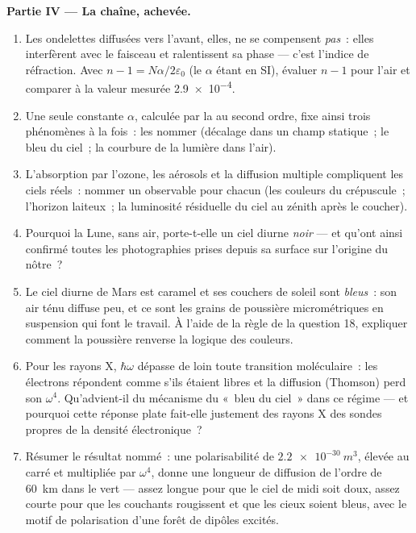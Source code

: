\begin{problem}
\medskip\noindent\textbf{Partie IV --- La chaîne, achevée.}
\begin{enumerate}[resume]
  \item Les ondelettes diffusées vers l'avant, elles, ne se
        compensent \emph{pas}~: elles interfèrent avec le faisceau et
        ralentissent sa phase --- c'est l'indice de réfraction. Avec
        $n - 1 = N\alpha/2\varepsilon_0$ (le $\alpha$ étant en SI),
        évaluer $n - 1$ pour l'air et comparer à la valeur mesurée
        \num{2.9e-4}.
  \item Une seule constante $\alpha$, calculée par la  au second ordre, fixe ainsi trois phénomènes à
        la fois~: les nommer (décalage dans un champ statique~; le
        bleu du ciel~; la courbure de la lumière dans l'air).
  \item L'absorption par l'ozone, les aérosols et la diffusion
        multiple compliquent les ciels réels~: nommer un observable
        pour chacun (les couleurs du crépuscule~; l'horizon laiteux~;
        la luminosité résiduelle du ciel au zénith après le coucher).
  \item Pourquoi la Lune, sans air, porte-t-elle un ciel diurne
        \emph{noir} --- et qu'ont ainsi confirmé toutes les
        photographies prises depuis sa surface sur l'origine du
        nôtre~?
  \item Le ciel diurne de Mars est caramel et ses couchers de soleil
        sont \emph{bleus}~: son air ténu diffuse peu, et ce sont les
        grains de poussière micrométriques en suspension qui font le
        travail. À l'aide de la règle de la question 18, expliquer
        comment la poussière renverse la logique des couleurs.
  \item Pour les rayons X, $\hbar\omega$ dépasse de loin toute
        transition moléculaire~: les électrons répondent comme s'ils
        étaient libres et la diffusion (Thomson) perd son $\omega^4$.
        Qu'advient-il du mécanisme du «~bleu du ciel~» dans ce
        régime --- et pourquoi cette réponse plate fait-elle
        justement des rayons X des sondes propres de la densité
        électronique~?
  \item Résumer le résultat nommé~: une polarisabilité de
        $\qty{2.2e-30}{m^3}$, élevée au carré et multipliée par
        $\omega^4$, donne une longueur de diffusion de l'ordre de
        \qty{60}{km} dans le vert --- assez longue pour que le ciel de
        midi soit doux, assez courte pour que les couchants
        rougissent et que les cieux soient bleus, avec le motif de
        polarisation d'une forêt de dipôles excités.
\end{enumerate}
\end{problem}

